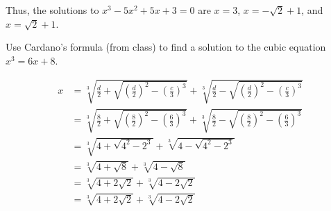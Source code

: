 \documentclass[11pt]{article}       %
\theoremstyle{definition}
\begin{document}
    Thus, the solutions to $x^3-5x^2+5x+3=0$ are $x=3$, $x=-\sqrt{2}+1$, and $x=\sqrt{2}+1$.

\newpage
{}  Use Cardano's formula (from class) to find a solution to the cubic equation $x^3=6x+8$.

    \begin{align*}
        x &= \sqrt[3]{\frac d2 + \sqrt{\left(\frac d2\right)^2 - \left(\frac c3\right)^3}} + \sqrt[3]{\frac d2 - \sqrt{\left(\frac d2\right)^2 - \left(\frac c3\right)^3}} \\
          &= \sqrt[3]{\frac 82 + \sqrt{\left(\frac 82\right)^2 - \left(\frac 63\right)^3}} + \sqrt[3]{\frac 82 - \sqrt{\left(\frac 82\right)^2 - \left(\frac 63\right)^3}} \\
          &= \sqrt[3]{4 + \sqrt{4^2 - 2^3}} + \sqrt[3]{4 - \sqrt{4^2 - 2^3}} \\
          &= \sqrt[3]{4 + \sqrt{8}} + \sqrt[3]{4 - \sqrt{8}} \\
          &= \sqrt[3]{4 + 2\sqrt{2}} + \sqrt[3]{4 - 2\sqrt{2}} \\
          &= \sqrt[3]{4 + 2\sqrt{2}} + \sqrt[3]{4 - 2\sqrt{2}}
    \end{align*}
\end{document}
